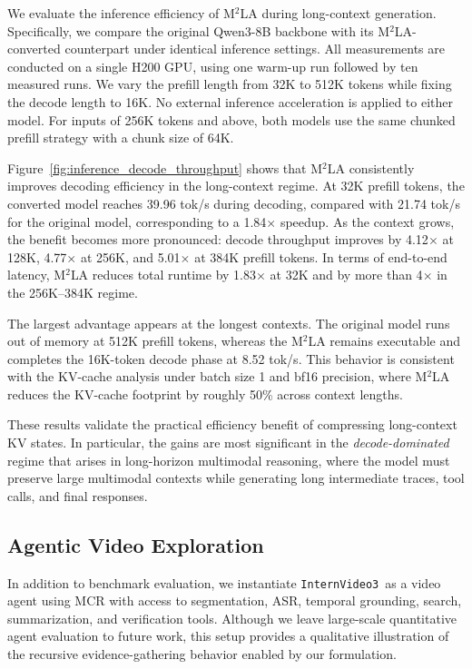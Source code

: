\documentclass[11pt, letterpaper]{template}
\theoremstyle{plain}
\theoremstyle{definition}
\theoremstyle{remark}
\newcommand{\name}{\texttt{InternVideo3}\xspace}
\begin{document}
We evaluate the inference efficiency of M$^2$LA during long-context generation. Specifically, we compare the original Qwen3-8B backbone with its M$^2$LA-converted counterpart under identical inference settings. All measurements are conducted on a single H200 GPU, using one warm-up run followed by ten measured runs. We vary the prefill length from 32K to 512K tokens while fixing the decode length to 16K. No external inference acceleration is applied to either model. For inputs of 256K tokens and above, both models use the same chunked prefill strategy with a chunk size of 64K.

Figure~\ref{fig:inference_decode_throughput} shows that M$^2$LA consistently improves decoding efficiency in the long-context regime. At 32K prefill tokens, the converted model reaches 39.96 tok/s during decoding, compared with 21.74 tok/s for the original model, corresponding to a 1.84$\times$ speedup. As the context grows, the benefit becomes more pronounced: decode throughput improves by 4.12$\times$ at 128K, 4.77$\times$ at 256K, and 5.01$\times$ at 384K prefill tokens. In terms of end-to-end latency, M$^2$LA reduces total runtime by 1.83$\times$ at 32K and by more than 4$\times$ in the 256K--384K regime.

The largest advantage appears at the longest contexts. The original model runs out of memory at 512K prefill tokens, whereas the M$^2$LA remains executable and completes the 16K-token decode phase at 8.52 tok/s. This behavior is consistent with the KV-cache analysis under batch size 1 and bf16 precision, where M$^2$LA reduces the KV-cache footprint by roughly 50\% across context lengths.

These results validate the practical efficiency benefit of compressing long-context KV states. In particular, the gains are most significant in the \emph{decode-dominated} regime that arises in long-horizon multimodal reasoning, where the model must preserve large multimodal contexts while generating long intermediate traces, tool calls, and final responses.


 

\subsection{Agentic Video Exploration}

In addition to benchmark evaluation, we instantiate \name\ as a video agent using MCR with access to segmentation, ASR, temporal grounding, search, summarization, and verification tools. Although we leave large-scale quantitative agent evaluation to future work, this setup provides a qualitative illustration of the recursive evidence-gathering behavior enabled by our formulation.
\end{document}
